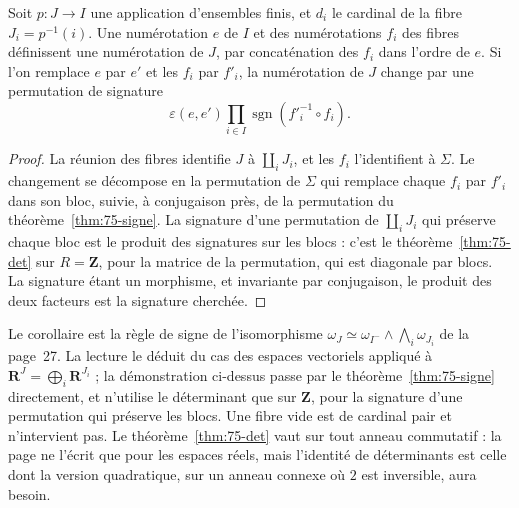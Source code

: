 \begin{encadre}
\begin{corollaire}\label{cor:75-fibres}
Soit $p : J \to I$ une application d'ensembles finis, et $d_i$ le cardinal de la fibre $J_i = p^{-1}(i)$. Une numérotation $e$ de $I$ et des numérotations $f_i$ des fibres définissent une numérotation de $J$, par concaténation des $f_i$ dans l'ordre de $e$. Si l'on remplace $e$ par $e'$ et les $f_i$ par $f'_i$, la numérotation de $J$ change par une permutation de signature
\[
\varepsilon(e, e') \prod_{i \in I} \operatorname{sgn}(f'^{-1}_i \circ f_i) .
\]
\end{corollaire}
\end{encadre}

\begin{proof}
La réunion des fibres identifie $J$ à $\coprod_i J_i$, et les $f_i$ l'identifient à $\Sigma$. Le changement se décompose en la permutation de $\Sigma$ qui remplace chaque $f_i$ par $f'_i$ dans son bloc, suivie, à conjugaison près, de la permutation du théorème~\ref{thm:75-signe}. La signature d'une permutation de $\coprod_i J_i$ qui préserve chaque bloc est le produit des signatures sur les blocs : c'est le théorème~\ref{thm:75-det} sur $R = \mathbf Z$, pour la matrice de la permutation, qui est diagonale par blocs. La signature étant un morphisme, et invariante par conjugaison, le produit des deux facteurs est la signature cherchée.
\end{proof}

\begin{remarque}
Le corollaire est la règle de signe de l'isomorphisme $\omega_J \simeq \omega_{I^-} \wedge \bigwedge_i \omega_{J_i}$ de la page~27. La lecture le déduit du cas des espaces vectoriels appliqué à $\mathbf R^J = \bigoplus_i \mathbf R^{J_i}$ ; la démonstration ci-dessus passe par le théorème~\ref{thm:75-signe} directement, et n'utilise le déterminant que sur $\mathbf Z$, pour la signature d'une permutation qui préserve les blocs. Une fibre vide est de cardinal pair et n'intervient pas. Le théorème~\ref{thm:75-det} vaut sur tout anneau commutatif : la page ne l'écrit que pour les espaces réels, mais l'identité de déterminants est celle dont la version quadratique, sur un anneau connexe où $2$ est inversible, aura besoin.
\end{remarque}

